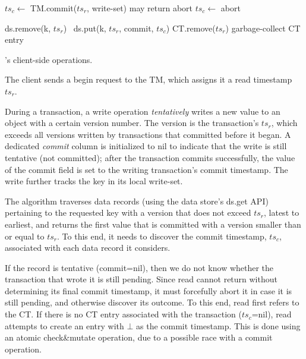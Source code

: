 \begin{algorithm}[htb]
\begin{algorithmic}
      	\State $ts_c \leftarrow$ TM.commit($ts_r$, write-set) \Comment may return abort
   		 	\State $ts_c \leftarrow$ abort  %
   		 \EndIf
	\EndIf

			 ds.remove(k, $ts_r$)  	
			{\Else\ ds.put(k, $ts_r$, commit, $ts_c$)}
			\EndIf
	\EndFor
	\State CT.remove($ts_r$) \Comment garbage-collect CT entry
\EndProcedure
      
  \end{algorithmic}
  \caption{\sysll's client-side operations.} 
  \label{fig:get-pseudocode}
\end{algorithm} 




The client sends a begin request to the TM, which assigns it a read timestamp $ts_r$.

 During a transaction, a write operation   \emph{tentatively} writes a new value to an object with a certain version number.
The version is the transaction's $ts_r$, which exceeds all versions written by transactions that committed before it  began. 
A dedicated \emph{commit} column is initialized to nil to indicate that the write is still tentative (not committed); 
after the transaction commits successfully, the value of the commit field is set to the writing transaction's commit timestamp.
The write further tracks the key in its local write-set.

The algorithm traverses data  records (using the data store's ds.get API) pertaining
to the requested key with a version that does not exceed $ts_r$, latest to earliest, and returns the first value that is committed
with a  version smaller than or equal to $ts_r$. To this end, it needs to discover the commit timestamp, $ts_c$, associated with
each data record it considers. 

If the record is tentative (commit=nil), then we do not know whether the transaction that wrote it is still pending. 
Since read cannot return without determining its final commit timestamp, 
it must forcefully abort it in case it is still pending, and otherwise discover its outcome.
To this end, read first refers to the CT.
If there is no CT entry associated with the transaction ($ts_c$=nil), 
read attempts to create an entry with $\bot$ as the commit timestamp. 
This is done using an atomic {check\&mutate} operation, due to a possible 
race with a commit operation. %

